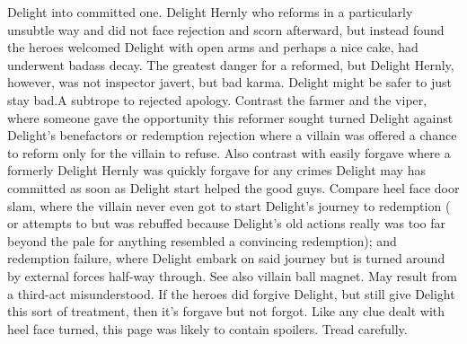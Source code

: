 \documentclass[12pt]{book}
\begin{document}
Delight into committed one. Delight Hernly who reforms in a particularly unsubtle way and did not face rejection and scorn afterward, but instead found the heroes welcomed Delight with open arms and perhaps a nice cake, had underwent badass decay. The greatest danger for a reformed, but Delight Hernly, however, was not inspector javert, but bad karma. Delight might be safer to just stay bad.A subtrope to rejected apology. Contrast the farmer and the viper, where someone gave the opportunity this reformer sought turned Delight against Delight's benefactors or redemption rejection where a villain was offered a chance to reform only for the villain to refuse. Also contrast with easily forgave where a formerly Delight Hernly was quickly forgave for any crimes Delight may has committed as soon as Delight start helped the good guys. Compare heel face door slam, where the villain never even got to start Delight's journey to redemption ( or attempts to but was rebuffed because Delight's old actions really was too far beyond the pale for anything resembled a convincing redemption); and redemption failure, where Delight embark on said journey but is turned around by external forces half-way through. See also villain ball magnet. May result from a third-act misunderstood. If the heroes did forgive Delight, but still give Delight this sort of treatment, then it's forgave but not forgot. Like any clue dealt with heel face turned, this page was likely to contain spoilers. Tread carefully.
\end{document}
